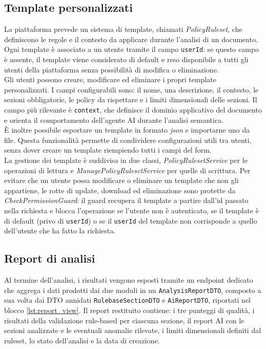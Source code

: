 \subsection{Template personalizzati}
La piattaforma prevede un sistema di template, chiamati \emph{PolicyRuleset}, che definiscono le regole e il contesto da applicare durante l'analisi di un documento. Ogni template è associato a un utente tramite il campo \texttt{userId}: se questo campo è assente, il template viene considerato di default e reso disponibile a tutti gli utenti della piattaforma senza possibilità di modifica o eliminazione.\\

Gli utenti possono creare, modificare ed eliminare i propri template personalizzati. I campi configurabili sono: il nome, una descrizione, il contesto, le sezioni obbligatorie, le policy da rispettare e i limiti dimensionali delle sezioni. Il campo più rilevante è \texttt{context}, che definisce il dominio applicativo del documento e orienta il comportamento dell'agente AI durante l'analisi semantica.\\

È inoltre possibile esportare un template in formato \emph{json} e importarne uno da file. Questa funzionalità permette di condividere configurazioni utili tra utenti, senza dover creare un template riempiendo tutti i campi del form.\\

La gestione dei template è suddivisa in due classi, \emph{PolicyRulesetService} per le operazioni di lettura e \emph{ManagePolicyRulesetService} per quelle di scrittura. Per evitare che un utente possa modificare o eliminare un template che non gli appartiene, le rotte di update, download ed eliminazione sono protette da \emph{CheckPermissionGuard}: il guard recupera il template a partire dall'id passato nella richiesta e blocca l'operazione se l'utente non è autenticato, se il template è di default (privo di \texttt{userId}) o se il \texttt{userId} del template non corrisponde a quello dell'utente che ha fatto la richiesta.

\subsection{Report di analisi}
Al termine dell'analisi, i risultati vengono esposti tramite un endpoint dedicato che aggrega i dati prodotti dai due moduli in un \texttt{AnalysisReportDTO}, composto a sua volta dai DTO annidati \texttt{RulebaseSectionDTO} e \texttt{AiReportDTO}, riportati nel blocco \ref{lst:report_view}. Il report restituito contiene: i tre punteggi di qualità, i risultati della validazione rule-based per ciascuna sezione, il report AI con le sezioni analizzate e le eventuali anomalie rilevate, i limiti dimensionali definiti dal ruleset, lo stato dell'analisi e la data di creazione.\\

